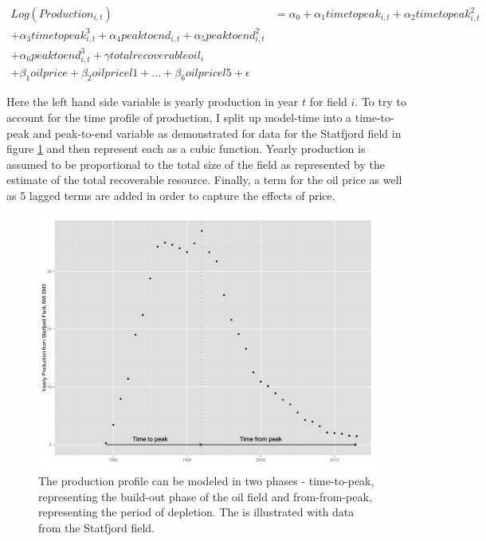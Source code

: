 \documentclass[12pt]{article}
\begin{document}
	\begin{multline}	
	 Log(Production_{i,t}) & = \alpha_0 + \alpha_1 timetopeak_{i,t} + \alpha_2 timetopeak_{i,t}^2 \\
	 + \alpha_3 timetopeak_{i,t}^3  + \alpha_4 peaktoend_{i,t} + \alpha_5 peaktoend_{i,t}^2 \\
	 + \alpha_6 peaktoend_{i,t}^3 + \gamma totalrecoverableoil_i \\
	 + \beta_1 oilprice + \beta_2 oilpricel1 + ...+ \beta_6 oilpricel5 + \epsilon	
\label{glm_eqn}
	\end{multline}

Here the left hand side variable is yearly production in year $t$ for field $i$.  To try to account for the time profile of production, I split up model-time into a time-to-peak and peak-to-end variable as demonstrated for data for the Statfjord field in figure \ref{statfjord_dem} and then represent each as a cubic function.  Yearly production is assumed to be proportional to the total size of the field as represented by the estimate of the total recoverable resource.  Finally, a term for the oil price as well as 5 lagged terms are added in order to capture the effects of price.  

\begin{figure}
\includegraphics[width=1\textwidth]{figures/statfjord_dem_print.png}
\caption{The production profile can be modeled in two phases - time-to-peak, representing the build-out phase of the oil field and from-from-peak, representing the period of depletion. The is illustrated with data from the Statfjord field.}
\label{statfjord_dem}
\end{figure}
\end{document}
